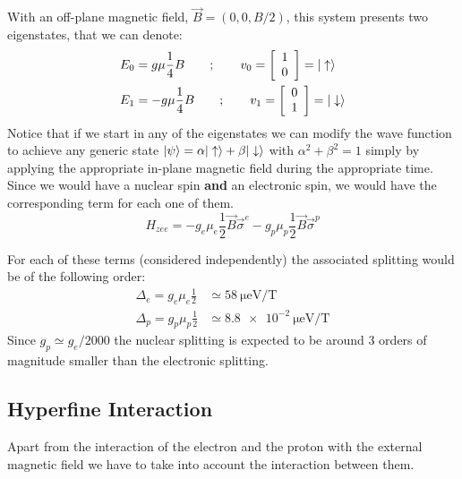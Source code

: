 With an off-plane magnetic field, $\vec{B}=(0,0,B/2)$, this system presents two eigenstates, that we can denote:
\begin{equation}
  \begin{split}
    E_0 &= g\mu\frac{1}{4}B \quad\quad;\quad\quad
    v_0 = \left[\begin{array}{c}
    1\\
    0
    \end{array}\right] = |\uparrow\rangle\\
    E_1 &= -g\mu\frac{1}{4}B \quad\quad;\quad\quad
    v_1 = \left[\begin{array}{c}
    0\\
    1
  \end{array}\right] = |\downarrow\rangle
  \end{split}
\end{equation}
Notice that if we start in any of the eigenstates we can modify the wave function to achieve any generic state $|\psi\rangle = \alpha|\uparrow\rangle+\beta|\downarrow\rangle$ with $\alpha^2+\beta^2 = 1$ simply by applying the appropriate in-plane magnetic field during the appropriate time.\\


Since we would have a nuclear spin \textbf{and} an electronic spin, we would have the corresponding term for each one of them.
\begin{equation}
  H_{zee} = -g_e\mu_e\frac{1}{2}\vec{B}\vec{\sigma}^e - g_p\mu_p\frac{1}{2}\vec{B}\vec{\sigma}^p
\end{equation}

For each of these terms (considered independently) the associated splitting would be of the following order:
\begin{equation}
  \begin{split}
    \Delta_e = g_e\mu_e\frac{1}{2} &\simeq \SI{58}{\micro\eV\per\tesla} \\  %
    \Delta_p = g_p\mu_p\frac{1}{2} &\simeq \SI{8.8e-2}{\micro\eV\per\tesla}
  \end{split}
\end{equation}
Since $g_p\simeq g_e/2000$ the nuclear splitting is expected to be around 3 orders of magnitude smaller than the electronic splitting.



\subsection{Hyperfine Interaction}
\label{sec:hyperfine}
Apart from the interaction of the electron and the proton with the external magnetic field we have to take into account the interaction between them.

